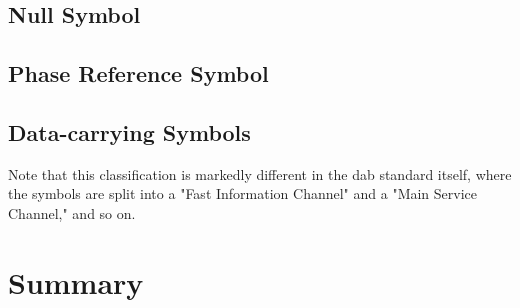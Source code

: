\documentclass[class=report,11pt,crop=false]{standalone}
\begin{document}
\subsection{Null Symbol \label{subsect:dab-std_null}}


\subsection{Phase Reference Symbol \label{subsect:dab-std_prs}}


\subsection{Data-carrying Symbols \label{subsect:dab-std_data}}
Note that this classification is markedly different in the \gls{dab} standard itself, where the symbols are split into a "Fast Information Channel" and a "Main Service Channel," and so on.

\section{Summary}


\ifstandalone

\printnoidxglossary[type=\acronymtype, nonumberlist]
\fi
\end{document}
